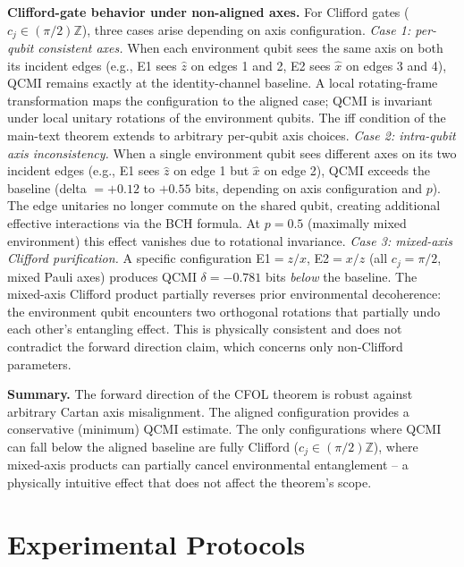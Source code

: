 \documentclass[aps,prl,showpacs]{revtex4-2}
\begin{document}
\textbf{Clifford-gate behavior under non-aligned axes.} For Clifford gates ($c_j \in (\pi/2)\mathbb{Z}$), three cases arise depending on axis configuration. \textit{Case 1: per-qubit consistent axes.} When each environment qubit sees the same axis on both its incident edges (e.g., E1 sees $\hat{z}$ on edges 1 and 2, E2 sees $\hat{x}$ on edges 3 and 4), QCMI remains exactly at the identity-channel baseline. A local rotating-frame transformation maps the configuration to the aligned case; QCMI is invariant under local unitary rotations of the environment qubits. The iff condition of the main-text theorem extends to arbitrary per-qubit axis choices. \textit{Case 2: intra-qubit axis inconsistency.} When a single environment qubit sees different axes on its two incident edges (e.g., E1 sees $\hat{z}$ on edge 1 but $\hat{x}$ on edge 2), QCMI exceeds the baseline (delta $= +0.12$ to $+0.55$ bits, depending on axis configuration and $p$). The edge unitaries no longer commute on the shared qubit, creating additional effective interactions via the BCH formula. At $p=0.5$ (maximally mixed environment) this effect vanishes due to rotational invariance. \textit{Case 3: mixed-axis Clifford purification.} A specific configuration E1$=z/x$, E2$=x/z$ (all $c_j=\pi/2$, mixed Pauli axes) produces QCMI $\delta = -0.781$ bits \textit{below} the baseline. The mixed-axis Clifford product partially reverses prior environmental decoherence: the environment qubit encounters two orthogonal rotations that partially undo each other's entangling effect. This is physically consistent and does not contradict the forward direction claim, which concerns only non-Clifford parameters.

\textbf{Summary.} The forward direction of the CFOL theorem is robust against arbitrary Cartan axis misalignment. The aligned configuration provides a conservative (minimum) QCMI estimate. The only configurations where QCMI can fall below the aligned baseline are fully Clifford ($c_j \in (\pi/2)\mathbb{Z}$), where mixed-axis products can partially cancel environmental entanglement -- a physically intuitive effect that does not affect the theorem's scope.


\section{Experimental Protocols}
\end{document}

